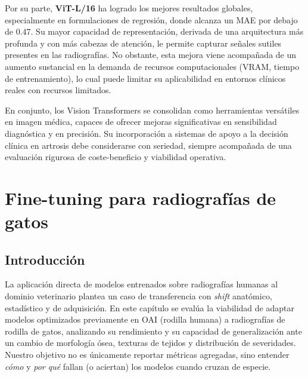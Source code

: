 \documentclass[11pt,spanish,listoffigures,listoftables]{tfgetsinf}
\begin{document}
Por su parte, \textbf{ViT-L/16} ha logrado los mejores resultados globales, especialmente en formulaciones de regresión, donde alcanza un MAE por debajo de 0.47. Su mayor capacidad de representación, derivada de una arquitectura más profunda y con más cabezas de atención, le permite capturar señales sutiles presentes en las radiografías. No obstante, esta mejora viene acompañada de un aumento sustancial en la demanda de recursos computacionales (VRAM, tiempo de entrenamiento), lo cual puede limitar su aplicabilidad en entornos clínicos reales con recursos limitados.

En conjunto, los Vision Transformers se consolidan como herramientas versátiles en imagen médica, capaces de ofrecer mejoras significativas en sensibilidad diagnóstica y en precisión. Su incorporación a sistemas de apoyo a la decisión clínica en artrosis debe considerarse con seriedad, siempre acompañada de una evaluación rigurosa de coste-beneficio y viabilidad operativa.


\chapter{Fine-tuning para radiografías de gatos}
\label{chap:gatos}

\section{Introducción}
La aplicación directa de modelos entrenados sobre radiografías humanas al dominio veterinario plantea un caso de transferencia con \emph{shift} anatómico, estadístico y de adquisición. En este capítulo se evalúa la viabilidad de adaptar modelos optimizados previamente en OAI (rodilla humana) a radiografías de rodilla de gatos, analizando su rendimiento y su capacidad de generalización ante un cambio de morfología ósea, texturas de tejidos y distribución de severidades. Nuestro objetivo no es únicamente reportar métricas agregadas, sino entender \emph{cómo} y \emph{por qué} fallan (o aciertan) los modelos cuando cruzan de especie.
\end{document}

